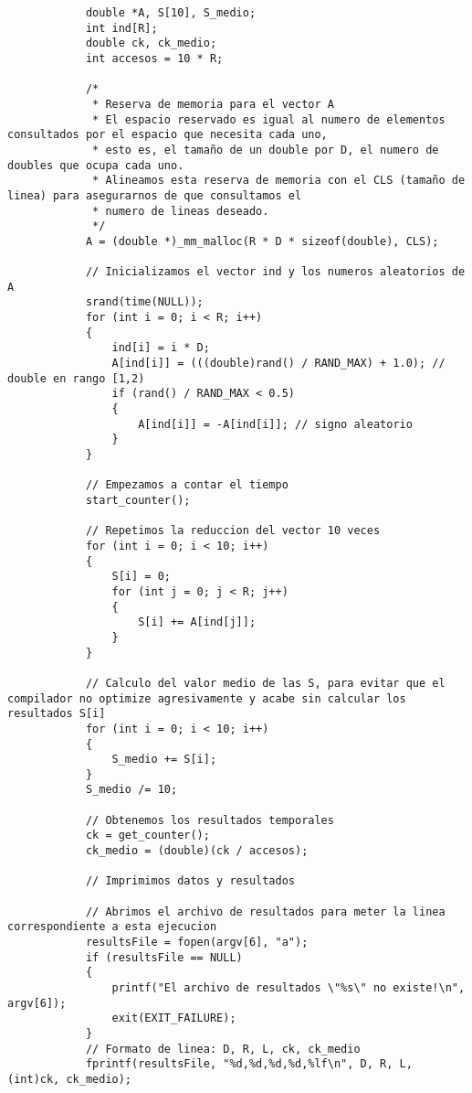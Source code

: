 \documentclass[a4paper,twocolumn]{article}
\begin{document}
\begin{lstlisting}
            double *A, S[10], S_medio;
            int ind[R];
            double ck, ck_medio;
            int accesos = 10 * R;
        
            /*
             * Reserva de memoria para el vector A
             * El espacio reservado es igual al numero de elementos consultados por el espacio que necesita cada uno,
             * esto es, el tamaño de un double por D, el numero de doubles que ocupa cada uno.
             * Alineamos esta reserva de memoria con el CLS (tamaño de linea) para asegurarnos de que consultamos el
             * numero de lineas deseado.
             */
            A = (double *)_mm_malloc(R * D * sizeof(double), CLS);
        
            // Inicializamos el vector ind y los numeros aleatorios de A
            srand(time(NULL));
            for (int i = 0; i < R; i++)
            {
                ind[i] = i * D;
                A[ind[i]] = (((double)rand() / RAND_MAX) + 1.0); // double en rango [1,2)
                if (rand() / RAND_MAX < 0.5)
                {
                    A[ind[i]] = -A[ind[i]]; // signo aleatorio
                }
            }
        
            // Empezamos a contar el tiempo
            start_counter();
        
            // Repetimos la reduccion del vector 10 veces
            for (int i = 0; i < 10; i++)
            {
                S[i] = 0;
                for (int j = 0; j < R; j++)
                {
                    S[i] += A[ind[j]];
                }
            }
        
            // Calculo del valor medio de las S, para evitar que el compilador no optimize agresivamente y acabe sin calcular los resultados S[i]
            for (int i = 0; i < 10; i++)
            {
                S_medio += S[i];
            }
            S_medio /= 10;
        
            // Obtenemos los resultados temporales
            ck = get_counter();
            ck_medio = (double)(ck / accesos);
        
            // Imprimimos datos y resultados
        
            // Abrimos el archivo de resultados para meter la linea correspondiente a esta ejecucion
            resultsFile = fopen(argv[6], "a");
            if (resultsFile == NULL)
            {
                printf("El archivo de resultados \"%s\" no existe!\n", argv[6]);
                exit(EXIT_FAILURE);
            }
            // Formato de linea: D, R, L, ck, ck_medio
            fprintf(resultsFile, "%d,%d,%d,%d,%lf\n", D, R, L, (int)ck, ck_medio);
        

\end{lstlisting}
\end{document}
